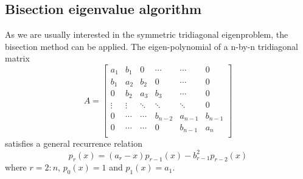 \subsection{Bisection eigenvalue algorithm} \label{bisection}
As we are usually interested in the symmetric tridiagonal eigenproblem, the bisection method can be applied. 
The eigen-polynomial of a n-by-n tridiagonal matrix
\begin{equation}
A=\left[\begin{array}{cccccc}   
    a_1 &    b_1    & 0   & \cdots  & \cdots  & 0\\  
    b_1 &    a_2    & b_2  & 0       & \cdots  & 0\\
    0 &    b_2    & a_3  & b_3       & \cdots  & 0\\ 
    \vdots &    \vdots    & \ddots  & \ddots  & \ddots  & 0\\ 
    0 &    \cdots    & \cdots  & b_{n-2}       & a_{n-1}  & b_{n-1}\\ 
    0 &    \cdots    & \cdots  & 0       & b_{n-1}  & a_{n}\\ 
\end{array}\right]
\end{equation} 
satisfies a general recurrence relation
\begin{equation}
	p_r(x)=(a_r-x)p_{r-1}(x)-b_{r-1}^2p_{r-2}(x)
\end{equation}
where $r=2:n$, $p_0(x)=1$ and $p_1(x)=a_1$.


